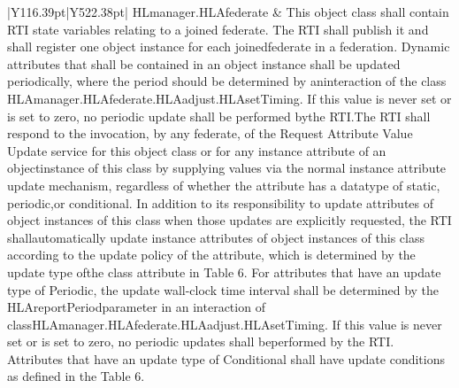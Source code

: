\begin{landscape}
\begin{momtabletypeset}[8.00]
{{\begin{tabular}{|Y{116.39pt}|Y{522.38pt}|}
                    HLmanager.\allowbreak{}HLAfederate        & This object class shall contain RTI state variables relating to a joined federate.\allowbreak{} The RTI shall publish it and shall register one object instance for each joined\allowbreak{}federate in a federation.\allowbreak{} Dynamic attributes that shall be contained in an object instance shall be updated periodically, where the period should be determined by an\allowbreak{}interaction of the class HLAmanager.\allowbreak{}HLAfederate.\allowbreak{}HLAadjust.\allowbreak{}HLAsetTiming.\allowbreak{} If this value is never set or is set to zero, no periodic update shall be performed by\allowbreak{}the RTI.\allowbreak{}\newline The RTI shall respond to the invocation, by any federate, of the Request Attribute Value Update service for this object class or for any instance attribute of an object\allowbreak{}instance of this class by supplying values via the normal instance attribute update mechanism, regardless of whether the attribute has a datatype of static, periodic,\newline or conditional.\allowbreak{} In addition to its responsibility to update attributes of object instances of this class when those updates are explicitly requested, the RTI shall\allowbreak{}automatically update instance attributes of object instances of this class according to the update policy of the attribute, which is determined by the update type of\allowbreak{}the class attribute in Table 6.\allowbreak{} For attributes that have an update type of Periodic, the update wall-clock time interval shall be determined by the HLAreportPeriod\allowbreak{}parameter in an interaction of classHLAmanager.\allowbreak{}HLAfederate.\allowbreak{}HLAadjust.\allowbreak{}HLAsetTiming.\allowbreak{} If this value is never set or is set to zero, no periodic updates shall be\allowbreak{}performed by the RTI.\allowbreak{} Attributes that have an update type of Conditional shall have update conditions as defined in the Table 6.\allowbreak{} \\
                    \hline
                \end{tabular}%
            }%
        }%
    \end{momtabletypeset}
    \newpage


\end{landscape}
